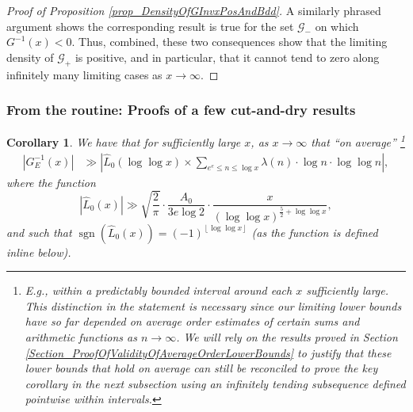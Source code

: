 \documentclass[11pt,reqno,a4letter]{article}
\numberwithin{figure}{section}
\numberwithin{table}{section}
\newcommand{\floor}[1]{\left\lfloor #1 \right\rfloor}
\theoremstyle{plain}
\newtheorem{cor}[theorem]{Corollary}
\numberwithin{theorem}{section}
\theoremstyle{definition}
\newcommand{\NBRef}[1]{}
\newcommand{\SuccSim}[0]{\overset{_{\scriptsize{\blacktriangle}}}{\succsim}}
\renewcommand{\SuccSim}[0]{\ensuremath{\gg}}
\begin{document}
\begin{proof}[Proof of Proposition \ref{prop_DensityOfGInvxPosAndBdd}]
A similarly phrased argument shows the corresponding result is true for the set $\mathcal{G}_{-}$ on which 
$G^{-1}(x) < 0$. 
Thus, combined, these two consequences show that the limiting density of $\mathcal{G}_{+}$ is positive, 
and in particular, that it cannot tend to zero along infinitely many limiting cases 
as $x \rightarrow \infty$. 
\end{proof} 

\subsubsection{From the routine: Proofs of a few cut-and-dry results} 
\label{subsubSection_RoutineProofsNeededForMainBoundOnGInvxFunc} 

\begin{cor} 
\label{cor_ASemiForm_ForGInvx_v1} 
We have that for sufficiently large $x$, as $x \rightarrow \infty$ that 
``on average'' \footnote{ 
     E.g., within a predictably bounded interval around each $x$ sufficiently large. 
     This distinction in the statement is necessary since our limiting lower bounds have 
     so far depended on average order estimates of certain sums and arithmetic functions 
     as $n \rightarrow \infty$. We will rely on the results proved in 
     Section \ref{Section_ProofOfValidityOfAverageOrderLowerBounds} to justify that these 
     lower bounds that hold on average can still be reconciled to prove 
     the key corollary in the next subsection using an infinitely tending subsequence 
     defined pointwise within intervals. 
} 
\begin{align*} 
\left\lvert G_E^{-1}(x) \right\rvert & \SuccSim 
     \left\lvert 
     \widehat{L}_0\left(\log\log x\right) \times \sum_{e^e \leq n \leq \log x} 
     \lambda(n) \cdot \log n \cdot \log\log n \right\rvert, 
\end{align*} 
where the function 
\[
\left\lvert \widehat{L}_0(x) \right\rvert \SuccSim 
     \sqrt{\frac{2}{\pi}} \cdot \frac{A_0}{3e \log 2} \cdot 
     \frac{x}{(\log\log x)^{\frac{5}{2} + \log\log x}}, 
\]
and such that $\operatorname{sgn}(\widehat{L}_0(x)) = (-1)^{\floor{\log\log x}}$ 
(as the function is defined inline below). 
\end{cor} 
\NBRef{A10-2020.04-26} 
\end{document}
